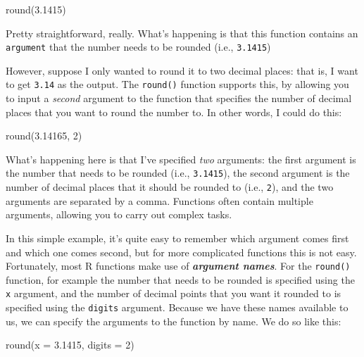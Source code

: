 \documentclass[
]{book}
\newenvironment{Shaded}{\begin{snugshade}}{\end{snugshade}}
\newcommand{\AttributeTok}[1]{\textcolor[rgb]{0.77,0.63,0.00}{#1}}
\newcommand{\DecValTok}[1]{\textcolor[rgb]{0.00,0.00,0.81}{#1}}
\newcommand{\FloatTok}[1]{\textcolor[rgb]{0.00,0.00,0.81}{#1}}
\newcommand{\FunctionTok}[1]{\textcolor[rgb]{0.00,0.00,0.00}{#1}}
\newcommand{\NormalTok}[1]{#1}
\begin{document}
\begin{Shaded}
\begin{Highlighting}[]
\FunctionTok{round}\NormalTok{(}\FloatTok{3.1415}\NormalTok{)}
\end{Highlighting}
\end{Shaded}

Pretty straightforward, really. What's happening is that this function contains an \texttt{argument} that the number needs to be rounded (i.e., \texttt{3.1415})

However, suppose I only wanted to round it to two decimal places: that is, I want to get \texttt{3.14} as the output. The \texttt{round()} function supports this, by allowing you to input a \emph{second} argument to the function that specifies the number of decimal places that you want to round the number to. In other words, I could do this:

\begin{Shaded}
\begin{Highlighting}[]
\FunctionTok{round}\NormalTok{(}\FloatTok{3.14165}\NormalTok{, }\DecValTok{2}\NormalTok{)}
\end{Highlighting}
\end{Shaded}

What's happening here is that I've specified \emph{two} arguments: the first argument is the number that needs to be rounded (i.e., \texttt{3.1415}), the second argument is the number of decimal places that it should be rounded to (i.e., \texttt{2}), and the two arguments are separated by a comma.
Functions often contain multiple arguments, allowing you to carry out complex tasks.

In this simple example, it's quite easy to remember which argument comes first and which one comes second, but for more complicated functions this is not easy. Fortunately, most R functions make use of \textbf{\emph{argument names}}. For the \texttt{round()} function, for example the number that needs to be rounded is specified using the \texttt{x} argument, and the number of decimal points that you want it rounded to is specified using the \texttt{digits} argument. Because we have these names available to us, we can specify the arguments to the function by name. We do so like this:

\begin{Shaded}
\begin{Highlighting}[]
\FunctionTok{round}\NormalTok{(}\AttributeTok{x =} \FloatTok{3.1415}\NormalTok{, }\AttributeTok{digits =} \DecValTok{2}\NormalTok{)}
\end{Highlighting}
\end{Shaded}
\end{document}
